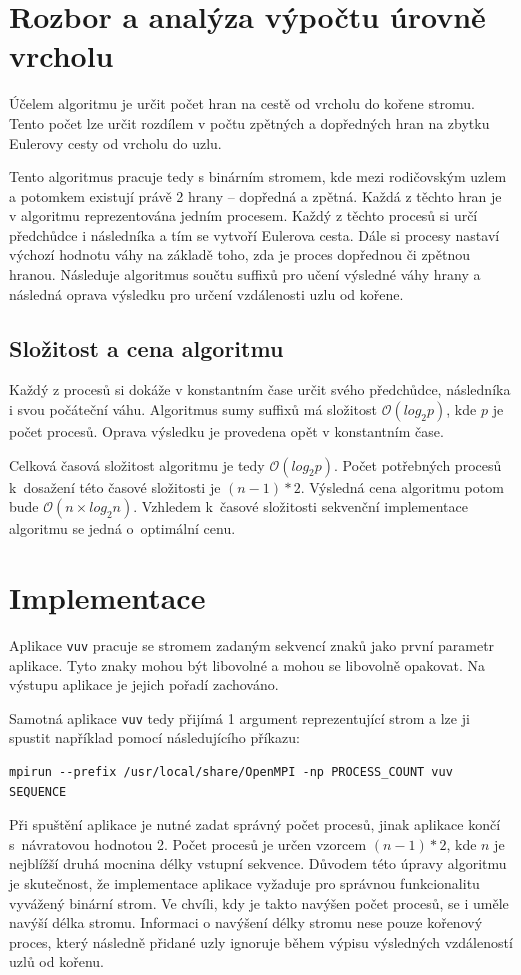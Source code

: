 \documentclass[11pt,a4paper,titlepage]{article}
\begin{document}
    \section{Rozbor a analýza výpočtu úrovně vrcholu}
        Účelem algoritmu je určit počet hran na cestě od vrcholu do kořene stromu. Tento počet
        lze určit rozdílem v počtu zpětných a dopředných hran na zbytku Eulerovy cesty od vrcholu
        do uzlu.

        Tento algoritmus pracuje tedy s binárním stromem, kde mezi rodičovským uzlem a potomkem existují
        právě 2 hrany -- dopředná a zpětná. Každá z těchto hran je v algoritmu reprezentována jedním procesem.
        Každý z těchto procesů si určí předchůdce i následníka a tím se vytvoří Eulerova cesta. Dále
        si procesy nastaví výchozí hodnotu váhy na základě toho, zda je proces dopřednou či zpětnou
        hranou. Následuje algoritmus součtu suffixů pro učení výsledné váhy hrany a následná oprava
        výsledku pro určení vzdálenosti uzlu od kořene.

        \subsection{Složitost a cena algoritmu}
        Každý z procesů si dokáže v konstantním čase určit svého předchůdce, následníka i svou počáteční váhu.
        Algoritmus sumy suffixů má složitost $\mathcal{O}(log_2 p)$, kde $p$ je počet procesů. Oprava výsledku
        je provedena opět v konstantním čase.

        Celková časová složitost algoritmu je tedy $\mathcal{O}(log_2 p)$. Počet potřebných procesů k~dosažení této
        časové složitosti je $(n - 1) * 2$. Výsledná cena algoritmu potom bude $\mathcal{O}(n \times log_2 n)$.
        Vzhledem k~časové složitosti sekvenční implementace algoritmu se jedná o~optimální cenu.

	\section{Implementace}
        Aplikace \texttt{vuv} pracuje se stromem zadaným sekvencí znaků jako první parametr aplikace.
        Tyto znaky mohou být libovolné a mohou se libovolně opakovat. Na výstupu aplikace je jejich pořadí zachováno.

        Samotná aplikace \texttt{vuv} tedy přijímá 1 argument reprezentující strom a lze ji spustit například pomocí následujícího příkazu:
\begin{verbatim}
mpirun --prefix /usr/local/share/OpenMPI -np PROCESS_COUNT vuv SEQUENCE
\end{verbatim}
        Při spuštění aplikace je nutné zadat správný počet procesů, jinak aplikace končí s~návratovou hodnotou 2.
        Počet procesů je určen vzorcem $(n - 1)*2$, kde $n$ je nejblížší druhá mocnina délky vstupní sekvence.
        Důvodem této úpravy algoritmu je skutečnost, že implementace aplikace vyžaduje pro správnou funkcionalitu
        vyvážený binární strom. Ve chvíli, kdy je takto navýšen počet procesů, se i uměle navýší délka stromu.
        Informaci o navýšení délky stromu nese pouze kořenový proces, který následně přidané uzly ignoruje
        během výpisu výsledných vzdáleností uzlů od kořenu.
\end{document}
